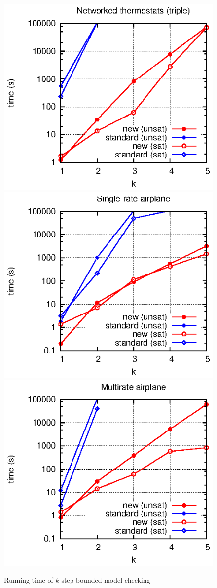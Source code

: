 \begin{figure}
\includegraphics[width=0.45\columnwidth]{plot/thermostat-triple.eps}    
\includegraphics[width=0.45\columnwidth]{plot/airplane-single.eps}    
\includegraphics[width=0.45\columnwidth]{plot/airplane-multi.eps}    
\caption{Running time of $k$-step bounded model checking}
\label{table:bounded}
\end{figure}


